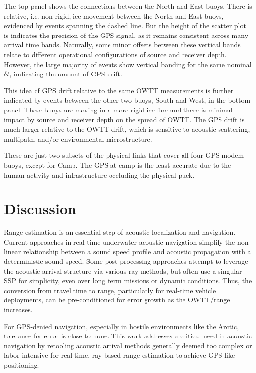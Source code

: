 The top panel shows the connections between the North and East buoys.
There is relative, i.e. non-rigid, ice movement between the North and East buoys, evidenced by events spanning the dashed line.
But the height of the scatter plot is indicates the precision of the GPS signal, as it remains consistent across many arrival time bands.
Naturally, some minor offsets between these vertical bands relate to different operational configurations of source and receiver depth.
However, the large majority of events show vertical banding for the same nominal $\delta t$, indicating the amount of GPS drift.

This idea of GPS drift relative to the same OWTT measurements is further indicated by events between the other two buoys, South and West, in the bottom panel.
These buoys are moving in a more rigid ice floe and there is minimal impact by source and receiver depth on the spread of OWTT.
The GPS drift is much larger relative to the OWTT drift, which is sensitive to acoustic scattering, multipath, and/or environmental microstructure.

These are just two subsets of the physical links that cover all four GPS modem buoys, except for Camp.
The GPS at camp is the least accurate due to the human activity and infrastructure occluding the physical puck.

\section{\label{sec:discussion} Discussion}

Range estimation is an essential step of acoustic localization and navigation.
Current approaches in real-time underwater acoustic navigation simplify the non-linear relationship between a sound speed profile and acoustic propagation with a deterministic sound speed.
Some post-processing approaches attempt to leverage the acoustic arrival structure via various ray methods, but often use a singular SSP for simplicity, even over long term missions or dynamic conditions.
Thus, the conversion from travel time to range, particularly for real-time vehicle deployments, can be pre-conditioned for error growth as the OWTT/range increases.

For GPS-denied navigation, especially in hostile environments like the Arctic, tolerance for error is close to none.
This work addresses a critical need in acoustic navigation by retooling acoustic arrival methods generally deemed too complex or labor intensive for real-time, ray-based range estimation to achieve GPS-like positioning.

